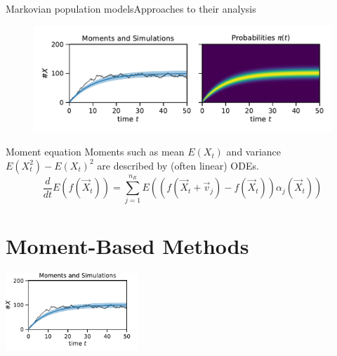 \documentclass[9pt]{beamer}
\newcommand{\expSym}{{E}}
\newcommand{\E}[1]{\ensuremath{\expSym\left(#1\right)}}
\begin{document}
\begin{frame}{Markovian population models}{Approaches to their analysis}
    \begin{figure}
        \centering
    \includegraphics[scale=.45]{../gfx/momsandprobs.pdf}
    \end{figure}
          \begin{block}{Moment equation}
              Moments such as mean $\E{X_t}$ and variance $\E{X_t^2}-\E{X_t}^2$ are described by (often {linear}) ODEs.
        \begin{equation*}
            \frac{d}{dt}\E{f({\vec{ X}}_t)} = \sum_{j=1}^{n_R}\E{\left(f({\vec X_t +
            \vec{v}_j}) - f(\vec X_t)\right)\alpha_j(\vec X_t)}
        \end{equation*}
          \end{block}
\end{frame}

\section{Moment-Based Methods}
\begin{frame}
  \vfill
  \centering
    \insertsectionhead\par%
    \vspace{1cm}
    \includegraphics[width=5cm]{../gfx/momsandsims.pdf}
  \vfill
\end{frame}
\end{document}
